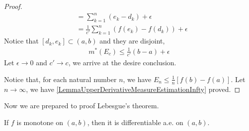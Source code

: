 \documentclass[lang=en, 12pt]{elegantbook}
\begin{document}
\begin{proof}
\begin{equation*}
\begin{aligned}
                    &= \sum_{k=1}^{n} (e_k - d_k) + \epsilon\\
                    &= \frac{1}{c'}\sum_{k=1}^{n} (f(e_k) - f(d_k)) + \epsilon
                \end{aligned}
            \end{equation*} 
            Notice that $[d_k, e_k] \subset (a,b)$ and they are disjoint, 
            \begin{equation*}
                \begin{aligned}
                    m^*(E_c) \leq \frac{1}{c'}(b-a) + \epsilon 
                \end{aligned}
            \end{equation*} 
            Let $\epsilon \to 0$ and $c' \to c$, we arrive at the desire conclusion. \par
            Notice that, for each natural number $n$, we have $E_n \leq \frac{1}{n} [f(b) -f(a)]$. Let $n \to \infty $,
        we have \eqref{LemmaUpperDerivativeMeasureEstimationInfty} proved.
        \end{proof}
        Now we are prepared to proof Lebesgue's theorem.
        \begin{theorem}
            If $f$ is monotone on $(a, b)$, then it is differentiable a.e. on $(a,b)$. 
        \end{theorem}
\end{document}

